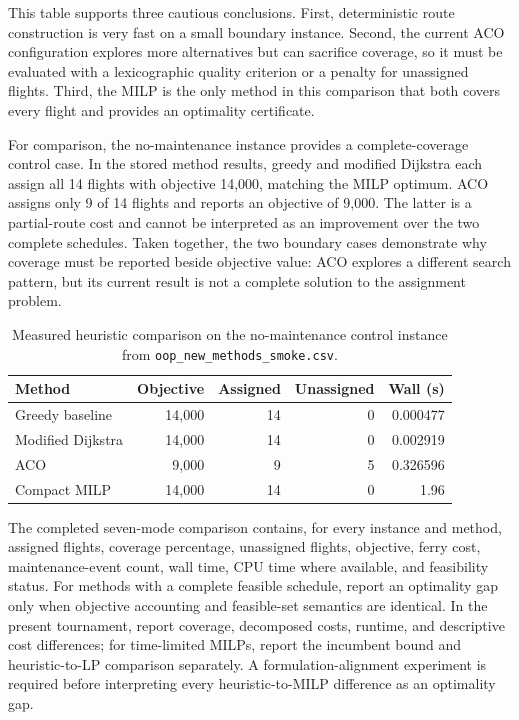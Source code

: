 This table supports three cautious conclusions. First, deterministic route
construction is very fast on a small boundary instance. Second, the current ACO
configuration explores more alternatives but can sacrifice coverage, so it
must be evaluated with a lexicographic quality criterion or a penalty for
unassigned flights. Third, the MILP is the only method in this comparison that
both covers every flight and provides an optimality certificate.

For comparison, the no-maintenance instance provides a complete-coverage
control case. In the stored method results, greedy and modified Dijkstra each
assign all 14 flights with objective 14,000, matching the MILP optimum. ACO
assigns only 9 of 14 flights and reports an objective of 9,000. The latter is a
partial-route cost and cannot be interpreted as an improvement over the two
complete schedules. Taken together, the two boundary cases demonstrate why
coverage must be reported beside objective value: ACO explores a different
search pattern, but its current result is not a complete solution to the
assignment problem.

\begin{table}[t]
\centering\small
\caption{Measured heuristic comparison on the no-maintenance control instance
from \texttt{oop\_new\_methods\_smoke.csv}.}
\label{tab:heuristic_no_maint}
\begin{tabular}{lrrrr}
\toprule
Method & Objective & Assigned & Unassigned & Wall (s) \\
\midrule
Greedy baseline & 14,000 & 14 & 0 & 0.000477 \\
Modified Dijkstra & 14,000 & 14 & 0 & 0.002919 \\
ACO & 9,000 & 9 & 5 & 0.326596 \\
Compact MILP & 14,000 & 14 & 0 & 1.96 \\
\bottomrule
\end{tabular}
\end{table}

The completed seven-mode comparison contains, for every instance and method,
assigned flights,
coverage percentage, unassigned flights, objective, ferry cost,
maintenance-event count, wall time, CPU time where available, and feasibility
status. For methods with a complete feasible schedule, report an optimality gap
only when objective accounting and feasible-set semantics are identical. In
the present tournament, report coverage, decomposed costs, runtime, and
descriptive cost differences; for time-limited MILPs, report the incumbent
bound and heuristic-to-LP comparison separately. A formulation-alignment
experiment is required before interpreting every heuristic-to-MILP difference
as an optimality gap.

